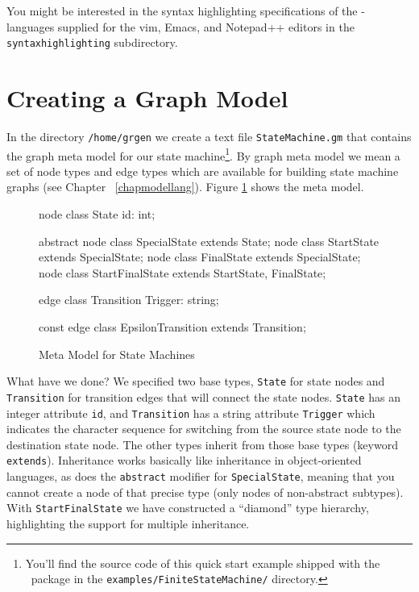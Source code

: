 \begin{note}
You might be interested in the syntax highlighting specifications of the \GrG-languages supplied for the vim, Emacs, and Notepad++ editors in the \texttt{syntaxhighlighting} subdirectory.
\end{note}


\section{Creating a Graph Model}

In the directory \texttt{/home/grgen} we create a text file \texttt{StateMachine.gm} that contains the graph meta model for our state machine\footnote{You'll find the source code of this quick start example shipped with the \GrG\ package in the \texttt{examples/FiniteStateMachine/} directory.}.
By graph meta model we mean a set of node types and edge types which are available for building state machine graphs (see Chapter~
\ref{chapmodellang}).
Figure \ref{fig:quick:mm} shows the meta model.

\begin{figure}[htbp]
    \centering
    \begin{grgen}
node class State {
    id: int;
}

abstract node class SpecialState extends State;
node class StartState extends SpecialState;
node class FinalState extends SpecialState;
node class StartFinalState extends StartState, FinalState;

edge class Transition {
    Trigger: string;
}

const edge class EpsilonTransition extends Transition;
    \end{grgen}
    \caption{Meta Model for State Machines}
    \label{fig:quick:mm}
\end{figure}

What have we done?
We specified two base types, \texttt{State} for state nodes and \texttt{Transition} for transition edges that will connect the state nodes.
\texttt{State} has an integer attribute \texttt{id}, and \texttt{Transition} has a string attribute \texttt{Trigger} which indicates the character sequence for switching from the source state node to the destination state node.
The other types inherit from those base types (keyword \texttt{extends}). 
Inheritance works basically like inheritance in object-oriented languages,
as does the \texttt{abstract} modifier for \texttt{SpecialState}, meaning that you cannot create a node of that precise type (only nodes of non-abstract subtypes).
With \texttt{StartFinalState} we have constructed a ``diamond'' type hierarchy,
highlighting the support for multiple inheritance.


